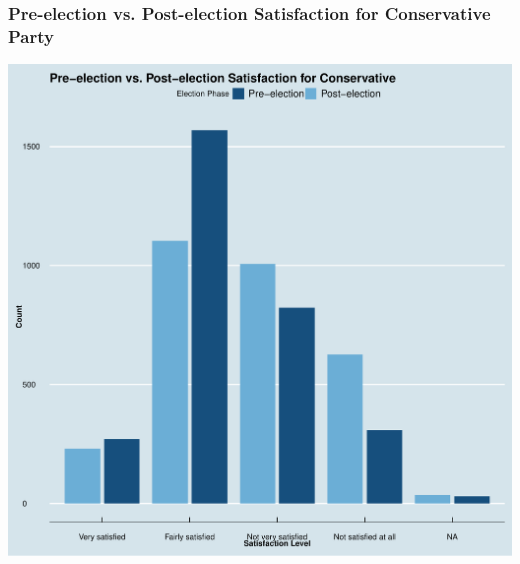 \documentclass{beamer}
\begin{document}
\begin{frame}
    \frametitle{Pre-election vs. Post-election Satisfaction for Conservative Party}
    \begin{center}
        \includegraphics[scale=0.3]{Pre-election vs. Post-election Satisfaction for Conservative.pdf}
    \end{center}
\end{frame}




\end{document}

